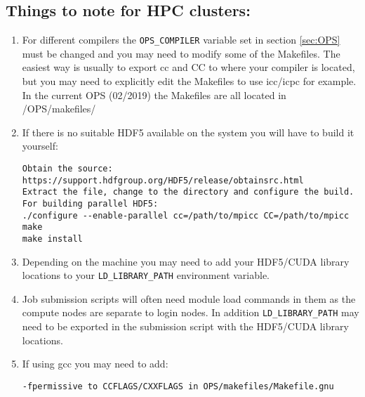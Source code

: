 \documentclass[11pt]{article}
\begin{document}
\subsection{Things to note for HPC clusters:}\label{sec:HPC}
\begin{enumerate}
\item{For different compilers the \verb|OPS_COMPILER| variable set in section \ref{sec:OPS} must be changed and you may need to modify some of the Makefiles. The easiest way is usually to export cc and CC to where your compiler is located, but you may need to explicitly edit the Makefiles to use icc/icpc for example. In the current OPS (02/2019) the Makefiles are all located in /OPS/makefiles/}

\item{If there is no suitable HDF5 available on the system you will have to build it yourself:}
\begin{verbatim}
Obtain the source: https://support.hdfgroup.org/HDF5/release/obtainsrc.html
Extract the file, change to the directory and configure the build.
For building parallel HDF5:
./configure --enable-parallel cc=/path/to/mpicc CC=/path/to/mpicc
make
make install
\end{verbatim} 

\item{Depending on the machine you may need to add your HDF5/CUDA library locations to your \verb|LD_LIBRARY_PATH| environment variable.}

\item{Job submission scripts will often need module load commands in them as the compute nodes are separate to login nodes. In addition \verb|LD_LIBRARY_PATH| may need to be exported in the submission script with the HDF5/CUDA library locations.}

\item{If using gcc you may need to add:}
\begin{verbatim}
-fpermissive to CCFLAGS/CXXFLAGS in OPS/makefiles/Makefile.gnu
\end{verbatim}

\end{enumerate}
\end{document}
